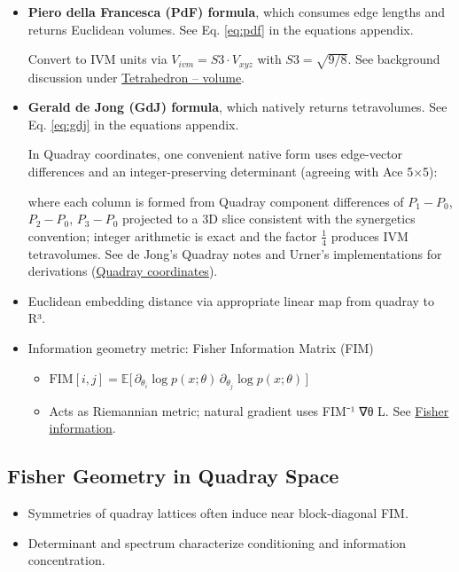 \documentclass[
  10pt,
]{article}
\providecommand{\tightlist}{%
  \setlength{\itemsep}{0pt}\setlength{\parskip}{0pt}}
\begin{document}
\begin{itemize}
\item
  \textbf{Piero della Francesca (PdF) formula}, which consumes edge
  lengths and returns Euclidean volumes. See Eq. \eqref{eq:pdf} in the
  equations appendix.

  Convert to IVM units via \(V_{ivm} = S3 \cdot V_{xyz}\) with
  \(S3=\sqrt{9/8}\). See background discussion under
  \href{https://en.wikipedia.org/wiki/Tetrahedron\#Volume}{Tetrahedron
  -- volume}.
\item
  \textbf{Gerald de Jong (GdJ) formula}, which natively returns
  tetravolumes. See Eq. \eqref{eq:gdj} in the equations appendix.

  In Quadray coordinates, one convenient native form uses edge-vector
  differences and an integer-preserving determinant (agreeing with Ace
  5×5):

  where each column is formed from Quadray component differences of
  \(P_1-P_0\), \(P_2-P_0\), \(P_3-P_0\) projected to a 3D slice
  consistent with the synergetics convention; integer arithmetic is
  exact and the factor \(\tfrac{1}{4}\) produces IVM tetravolumes. See
  de Jong's Quadray notes and Urner's implementations for derivations
  (\href{https://en.wikipedia.org/wiki/Quadray_coordinates}{Quadray
  coordinates}).
\item
  Euclidean embedding distance via appropriate linear map from quadray
  to R³.
\item
  Information geometry metric: Fisher Information Matrix (FIM)

  \begin{itemize}
  \tightlist
  \item
    \(\mathrm{FIM}[i,j] = \mathbb{E}\big[\, \partial_{\theta_i} \log p(x;\theta)\,\partial_{\theta_j} \log p(x;\theta)\,\big]\)
  \item
    Acts as Riemannian metric; natural gradient uses FIM⁻¹ ∇θ L. See
    \href{https://en.wikipedia.org/wiki/Fisher_information}{Fisher
    information}.
  \end{itemize}
\end{itemize}

\hypertarget{fisher-geometry-in-quadray-space}{%
\subsection{Fisher Geometry in Quadray
Space}\label{fisher-geometry-in-quadray-space}}

\begin{itemize}
\tightlist
\item
  Symmetries of quadray lattices often induce near block-diagonal FIM.
\item
  Determinant and spectrum characterize conditioning and information
  concentration.
\end{itemize}
\end{document}
